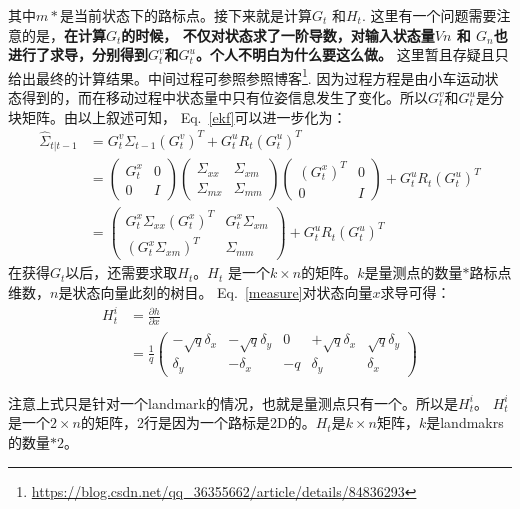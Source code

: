 \documentclass[UTF8,a4paper,10pt]{ctexart}
\begin{document}
其中$m*$是当前状态下的路标点。接下来就是计算$G_t$ 和$H_t$. 这里有一个问题需要注意的是，{\bfseries 在计算$G_t$的时候，
不仅对状态求了一阶导数，对输入状态量$Vn$ 和 $G_n$也进行了求导，分别得到$G_t^v$和$G_t^u$。个人不明白为什么要这么做。}
这里暂且存疑且只给出最终的计算结果。中间过程可参照参照博客\footnote{\url{https://blog.csdn.net/qq_36355662/article/details/84836293}}. 
因为过程方程是由小车运动状态得到的，而在移动过程中状态量中只有位姿信息发生了变化。所以$G_t^v$和$G_t^u$是分块矩阵。由以上叙述可知，
Eq.~\eqref{ekf}可以进一步化为：
\begin{align}
	\hat{\Sigma}_{t|t-1}&=G_t^v\Sigma_{t-1}(G_t^v)^T+G_t^uR_t(G_t^u)^T\\
	&=\left(
	\begin{array}{cc}
	G_t^x& 0\\
	0&     I
	\end{array}
	\right)\left(
	\begin{array}{cc}
	\Sigma_{xx}& \Sigma_{xm}\\
	\Sigma_{mx}& \Sigma_{mm}
	\end{array}
	\right)\left(
	\begin{array}{cc}
	(G_t^x)^T& 0\\
	0& I
	\end{array}
	\right)+G_t^uR_t(G_t^u)^T\\
	&=\left(
	\begin{array}{cc}
	G_t^x\Sigma_{xx}(G_t^x)^T& G_t^x\Sigma_{xm}\\
	(G_t^x\Sigma_{xm})^T& \Sigma_{mm}
	\end{array}
	\right)+G_t^uR_t(G_t^u)^T
\end{align}
在获得$G_t$以后，还需要求取$H_t$。$H_t$ 是一个$k \times n$的矩阵。$k$是量测点的数量$*$路标点维数，$n$是状态向量此刻的树目。
Eq.~\eqref{measure}对状态向量$x$求导可得：
\begin{align}
H_t^i&=\frac{\partial{h}}{\partial{x}}\\
	&=\frac{1}{q}\left(
	\begin{array}{ccccc}
		-\sqrt{q}\delta_x& -\sqrt{q}\delta_y& 0& +\sqrt{q}\delta_x& \sqrt{q}\delta_y\\
		\delta_y& -\delta_x& -q& \delta_y& \delta_x
	\end{array}
	\right)
\end{align}

注意上式只是针对一个landmark的情况，也就是量测点只有一个。所以是$H_t^i$。
$H_t^i$是一个$2 \times n$的矩阵，2行是因为一个路标是2D的。$H_t$是$k\times n$矩阵，$k$是landmakrs的数量$*2$。
\end{document}
